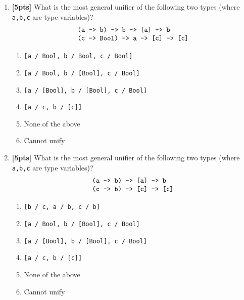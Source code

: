 \documentclass[paper=letter, fontsize=13pt]{article} %
\numberwithin{equation}{section} %
\newif\ifshowanswers\showanswersfalse
\begin{document}
\begin{enumerate}
\begin{enumerate}[label=(\Alph*)]
\ifshowanswers
\item App-R
\item App-L
\item App
\item \verb|(\y -> 2 + y) 6|
\item App
\item \verb|(\y -> 2 + y) 6|
\item Add
\else
\item \bigskip \bigskip
\item \bigskip \bigskip 
\item \bigskip \bigskip 
\item \bigskip \bigskip 
\item \bigskip \bigskip 
\item \bigskip \bigskip 
\item \bigskip \bigskip 
\fi
\end{enumerate}

\newpage
\item \textbf{[5pts]} What is the most general unifier of the following two 
types (where \texttt{a,b,c} are type variables)?
  \[
\begin{array}{l}
  \verb|(a -> b) -> b -> [a] -> b| \\
  \verb|(c -> Bool) -> a -> [c] -> [c]| \\
\end{array}
\]
\begin{enumerate}
\item \verb|[a / Bool, b / Bool, c / Bool]|
\item \verb|[a / Bool, b / [Bool], c / Bool]|
\item \verb|[a / [Bool], b / [Bool], c / Bool]|
\item \verb|[a / c, b / [c]]|
\item None of the above
\item Cannot unify
\end{enumerate}
  \bigskip
  \bigskip
  \bigskip

\item \textbf{[5pts]} What is the most general unifier of the following two types (where \texttt{a,b,c} are type variables)?
  \[
\begin{array}{l}
  \verb|(a -> b) -> [a] -> b| \\
  \verb|(c -> b) -> [c] -> [c]| 
\end{array}
\]
\begin{enumerate}
\item \verb|[b / c, a / b, c / b]|
\item \verb|[a / Bool, b / [Bool], c / Bool]|
\item \verb|[a / [Bool], b / [Bool], c / Bool]|
\item \verb|[a / c, b / [c]]|
\item None of the above
\item Cannot unify
\end{enumerate}
  \bigskip
  \bigskip
  \bigskip


\end{enumerate}
\end{document}
